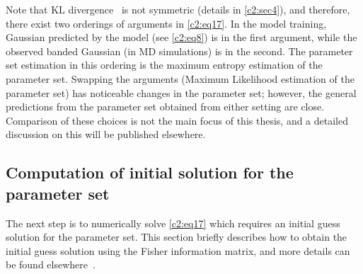 Note that KL divergence~\cite{kld} is not symmetric (details in \cref{c2:sec4}), and therefore, there exist two orderings of arguments in \cref{c2:eq17}. 
In the model training, Gaussian predicted by the model (see \cref{c2:eq8}) is in the first argument, while the observed banded Gaussian (in MD simulations) is in the second. The parameter set estimation in this ordering is the maximum entropy estimation of the parameter set.
Swapping the arguments (Maximum Likelihood estimation of the parameter set) has noticeable changes in the parameter set; however, the general predictions from the parameter set obtained from either setting are close. 
Comparison of these choices is not the main focus of this thesis, and a detailed discussion on this will be published elsewhere. \clearpage

\subsection{Computation of initial solution for the parameter set}\label{c2:s4:sb4}
The next step is to numerically solve \cref{c2:eq17} which requires an initial guess solution for the parameter set.
This section briefly describes how to obtain the initial guess solution using the Fisher information matrix, and more details can be found elsewhere~\cite{patelithesis}. 

